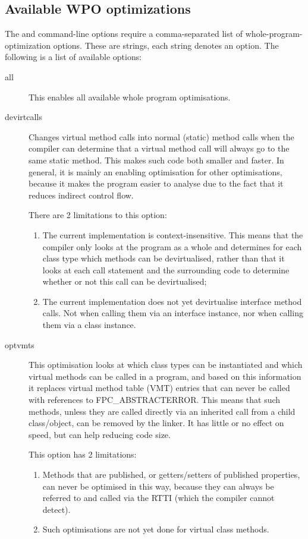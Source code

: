 \subsection{Available WPO optimizations}
The  and  command-line options require a comma-separated list of
whole-program-optimization options. These are strings, each string denotes
an option. The following is a list of available options:
\begin{description}
\item[all] This enables all available whole program optimisations.

\item[devirtcalls] Changes virtual method calls into normal (static) method
calls when the compiler can determine that a virtual method call will always
go to the same static method. This makes such code both smaller and faster.
In general, it is mainly an enabling optimisation for other optimisations,
because it makes the program easier to analyse due to the fact that it reduces
indirect control flow. 

There are 2 limitations to this option:
\begin{enumerate}
\item The current implementation is context-insensitive. This means that the
compiler only looks at the program as a whole and determines for each class
type which methods can be devirtualised, rather than that it looks at each
call statement and the surrounding code to determine whether or not this
call can be devirtualised; 
\item The current implementation does not yet devirtualise interface method
calls. Not when calling them via an interface instance, nor when calling 
them via a class instance.
\end{enumerate}

\item[optvmts]
This optimisation looks at which class types can be instantiated and which
virtual methods can be called in a program, and based on this information it
replaces virtual method table (VMT) entries that can never be called with
references to FPC\_ABSTRACTERROR. This means that such methods, unless they
are called directly via an inherited call from a child class/object, can be
removed by the linker. It has little or no effect on speed, but can help
reducing code size. 

This option has 2 limitations:
\begin{enumerate}
\item Methods that are published, or getters/setters of published properties, can
never be optimised in this way, because they can always be referred to and
called via the RTTI (which the compiler cannot detect). 
\item Such optimisations are not yet done for virtual class methods.
\end{enumerate}


\end{description}
